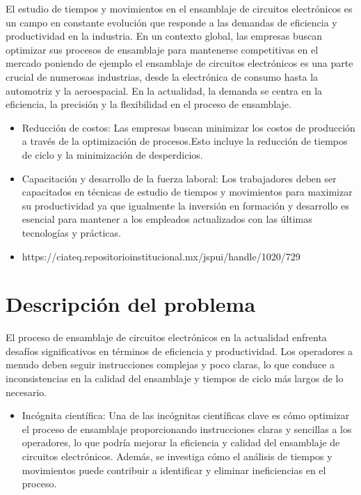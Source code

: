     El estudio de tiempos y movimientos en el ensamblaje de circuitos electrónicos es un campo en constante evolución que responde a las demandas de eficiencia y productividad en la industria. En un contexto global, las empresas buscan optimizar sus procesos de ensamblaje para mantenerse competitivas en el mercado poniendo de ejemplo el ensamblaje de circuitos electrónicos es una parte crucial de numerosas industrias, desde la electrónica de consumo hasta la automotriz y la aeroespacial. En la actualidad, la demanda se centra en la eficiencia, la precisión y la flexibilidad en el proceso de ensamblaje.
    \begin{itemize}
    
    \item Reducción de costos:
        Las empresas buscan minimizar los costos de producción a través de la optimización de procesos.Esto incluye la reducción de tiempos de ciclo y la minimización de desperdicios.
    
    \item Capacitación y desarrollo de la fuerza laboral:
        Los trabajadores deben ser capacitados en técnicas de estudio de tiempos y movimientos para maximizar su productividad ya que igualmente la inversión en formación y desarrollo es esencial para mantener a los empleados actualizados con las últimas tecnologías y prácticas.
    
        \item https://ciateq.repositorioinstitucional.mx/jspui/handle/1020/729
        
    \end{itemize}
    \section{Descripción del problema}
    
    El proceso de ensamblaje de circuitos electrónicos en la actualidad enfrenta desafíos significativos en términos de eficiencia y productividad. Los operadores a menudo deben seguir instrucciones complejas y poco claras, lo que conduce a inconsistencias en la calidad del ensamblaje y tiempos de ciclo más largos de lo necesario. 
    
    \begin{itemize}
        \item Incógnita científica:
    Una de las incógnitas científicas clave es cómo optimizar el proceso de ensamblaje proporcionando instrucciones claras y sencillas a los operadores, lo que podría mejorar la eficiencia y calidad del ensamblaje de circuitos electrónicos. Además, se investiga cómo el análisis de tiempos y movimientos puede contribuir a identificar y eliminar ineficiencias en el proceso.
    
       
    \end{itemize}
    
